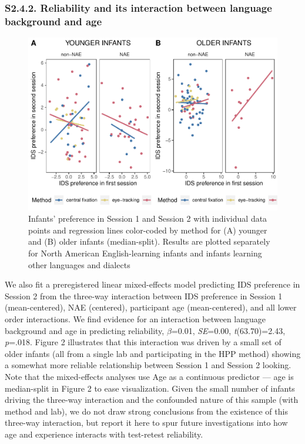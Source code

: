 \documentclass[
  man, donotrepeattitle,floatsintext]{apa6}
\begin{document}
\hypertarget{s2.4.2.-reliability-and-its-interaction-between-language-background-and-age}{%
\subsubsection{S2.4.2. Reliability and its interaction between language background and age}\label{s2.4.2.-reliability-and-its-interaction-between-language-background-and-age}}

\begin{figure}
\centering
\includegraphics{MB1T_supplement_files/figure-latex/unnamed-chunk-13-1.pdf}
\caption{\label{fig:unnamed-chunk-13}Infants' preference in Session 1 and Session 2 with individual data points and regression lines color-coded by method for (A) younger and (B) older infants (median-split). Results are plotted separately for North American English-learning infants and infants learning other languages and dialects}
\end{figure}

We also fit a preregistered linear mixed-effects model predicting IDS preference in Session 2 from the three-way interaction between IDS preference in Session 1 (mean-centered), NAE (centered), participant age (mean-centered), and all lower order interactions.
We find evidence for an interaction between language background and age in predicting reliability, \(\beta\)=0.01, \emph{SE}=0.00, \emph{t}(63.70)=2.43, \emph{p}=.018.
Figure 2 illustrates that this interaction was driven by a small set of older infants (all from a single lab and participating in the HPP method) showing a somewhat more reliable relationship between Session 1 and Session 2 looking.
Note that the mixed-effects analyses use Age as a continuous predictor --- age is median-split in Figure 2 to ease visualization.
Given the small number of infants driving the three-way interaction and the confounded nature of this sample (with method and lab), we do not draw strong conclusions from the existence of this three-way interaction, but report it here to spur future investigations into how age and experience interacts with test-retest reliability.
\end{document}
